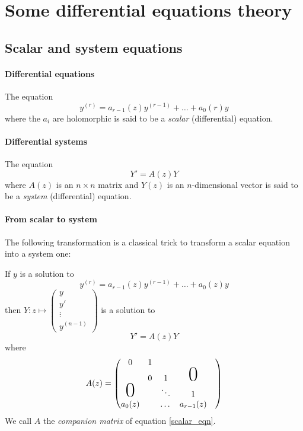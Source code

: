 \documentclass[../main.tex]{subfiles}
\begin{document}
\section{Some differential equations theory}

\subsection{Scalar and system equations}

\paragraph{Differential equations}

The equation
\begin{equation}\label{scalar_eq}
	y^{(r)} = a_{r - 1}(z) y^{(r - 1)} + \dots + a_0(r) y
\end{equation}
where the $a_i$ are holomorphic is said to be a \emph{scalar} (differential) equation.

\paragraph{Differential systems}

The equation
\begin{equation}\label{system_eq}
	Y' = A(z) Y
\end{equation}
where $A(z)$ is an $n \times n$ matrix and $Y(z)$ is an $n$-dimensional vector
is said to be a \emph{system} (differential) equation.

\paragraph{From scalar to system}

The following transformation is a classical trick to transform a scalar equation into a system one:

If $y$ is a solution to 
\begin{equation*}\label{scalar_eqn}
	y^{(r)} = a_{r - 1}(z) y^{(r - 1)} + \dots + a_0(z) y
\end{equation*}
then
$Y : z \mapsto \begin{pmatrix}
y\\
y'\\
\vdots \\
y^{(n - 1)}
\end{pmatrix}$
is a solution to
\begin{equation*}
	Y' = A(z)Y
\end{equation*} where
\begin{equation*}
A(z)=
\begin{pmatrix}
0&1&&&\\
 &0&1&\mbox{\Huge 0}\\
 \mbox{\Huge 0}& &\ddots & 1\\
a_0(z) & & \dots & a_{r - 1}(z)
\end{pmatrix}
\end{equation*}
We call $A$ the \emph{companion matrix} of equation \eqref{scalar_eqn}.
\end{document}
